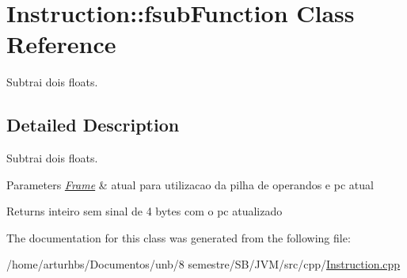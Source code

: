 \hypertarget{classInstruction_1_1fsubFunction}{}\section{Instruction\+:\+:fsub\+Function Class Reference}
\label{classInstruction_1_1fsubFunction}


Subtrai dois floats.  




\subsection{Detailed Description}
Subtrai dois floats. 


\begin{DoxyParams}{Parameters}
{\em \hyperlink{classFrame}{Frame}} & atual para utilizacao da pilha de operandos e pc atual \\
\hline
\end{DoxyParams}
\begin{DoxyReturn}{Returns}
inteiro sem sinal de 4 bytes com o pc atualizado 
\end{DoxyReturn}


The documentation for this class was generated from the following file\+:\begin{DoxyCompactItemize}
\item 
/home/arturhbs/\+Documentos/unb/8 semestre/\+S\+B/\+J\+V\+M/src/cpp/\hyperlink{Instruction_8cpp}{Instruction.\+cpp}\end{DoxyCompactItemize}
